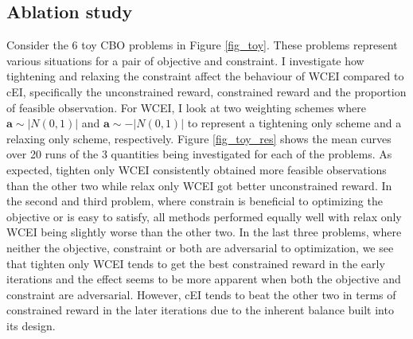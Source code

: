 \subsection{Ablation study}
Consider the 6 toy CBO problems in Figure \ref{fig_toy}. These problems represent various situations for a pair of objective and constraint. I investigate how tightening and relaxing the constraint affect the behaviour of WCEI compared to cEI, specifically the unconstrained reward, constrained reward and the proportion of feasible observation. For WCEI, I look at two weighting schemes where $\textbf{a}\sim |N(0,1)|$ and $\textbf{a}\sim -|N(0,1)|$ to represent a tightening only scheme and a relaxing only scheme, respectively. Figure \ref{fig_toy_res} shows the mean curves over 20 runs of the 3 quantities being investigated for each of the problems. As expected, tighten only WCEI consistently obtained more feasible observations than the other two while relax only WCEI got better unconstrained reward. In the second and third problem, where constrain is beneficial to optimizing the objective or is easy to satisfy, all methods performed equally well with relax only WCEI being slightly worse than the other two. In the last three problems, where neither the objective, constraint or both are adversarial to optimization, we see that tighten only WCEI tends to get the best constrained reward in the early iterations and the effect seems to be more apparent when both the objective and constraint are adversarial. However, cEI tends to beat the other two in terms of constrained reward in the later iterations due to the inherent balance built into its design. 
